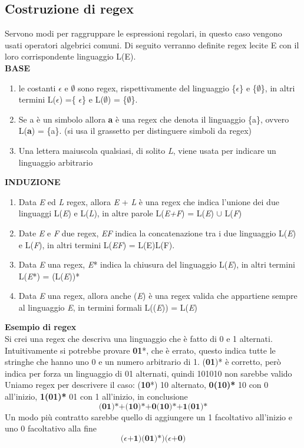 \documentclass[12pt]{article}
\begin{document}
	\newpage
	\subsection{Costruzione di regex}
	Servono modi per raggruppare le espressioni regolari, in questo caso vengono usati operatori algebrici comuni. Di seguito verranno definite regex lecite E con il loro corrispondente linguaggio L(E).
	\\ \textbf{BASE}
	\begin{enumerate}
		\item le costanti $\epsilon$ e $\emptyset$ sono regex, rispettivamente del linguaggio \{$\epsilon$\} e \{$\emptyset$\}, in altri termini L($\epsilon$) =\{ $\epsilon$\} e L($\emptyset$) = \{$\emptyset$\}.
		\item Se a è un simbolo allora \textbf{a} è una regex che denota il linguaggio \{a\}, ovvero L(\textbf{a}) = \{a\}. (si usa il grassetto per distinguere simboli da regex)
		\item Una lettera maiuscola qualsiasi, di solito \emph{L}, viene usata per indicare un linguaggio arbitrario
	\end{enumerate}
	\textbf{INDUZIONE}
	\begin{enumerate}
		\item Data \emph{E} ed \emph{L} regex, allora \emph{E} + \emph{L} è una regex che indica l'unione dei due linguaggi L(\emph{E}) e L(\emph{L}), in altre parole L(\emph{E+F}) = L(\emph{E}) $\cup$ L(\emph{F})
		\item Date \emph{E} e \emph{F} due regex, \emph{EF} indica la concatenazione tra i due linguaggio L(\emph{E}) e L(\emph{F}), in altri termini L(\emph{EF}) = L(E)L(F).
		\item Data \emph{E} una regex, \emph{E}* indica la chiusura del linguaggio L(\emph{E}), in altri termini L(\emph{E}*) = (L(\emph{E}))*
		\item Data \emph{E} una regex, allora anche (\emph{E}) è una regex valida che appartiene sempre al linguaggio \emph{E}, in termini formali L((\emph{E})) = L(\emph{E})
	\end{enumerate}
	\textbf{Esempio di regex}
	\\ Si crei una regex che descriva una linguaggio che è fatto di 0 e 1 alternati.
	\\ Intuitivamente si potrebbe provare \textbf{01}*, che è errato, questo indica tutte le stringhe che hanno uno 0 e un numero arbitrario di 1. (\textbf{01})* è corretto, però indica per forza un linguaggio di 01 alternati, quindi 101010 non sarebbe valido
	\\ Uniamo regex per descrivere il caso: (\textbf{10}*) 10 alternato,
	\textbf{0(10)*} 10 con 0 all'inizio,
	\textbf{1(01)*} 01 con 1 all'inizio,
	in conclusione
	\[\textbf{(01)*+(10)*+0(10)*+1(01)*}\]
	Un modo più contratto sarebbe quello di aggiungere un 1 facoltativo all'inizio e uno 0 facoltativo alla fine
	\[\textbf{($\epsilon$+1)(01)*)($\epsilon$+0)}\]
\end{document}
